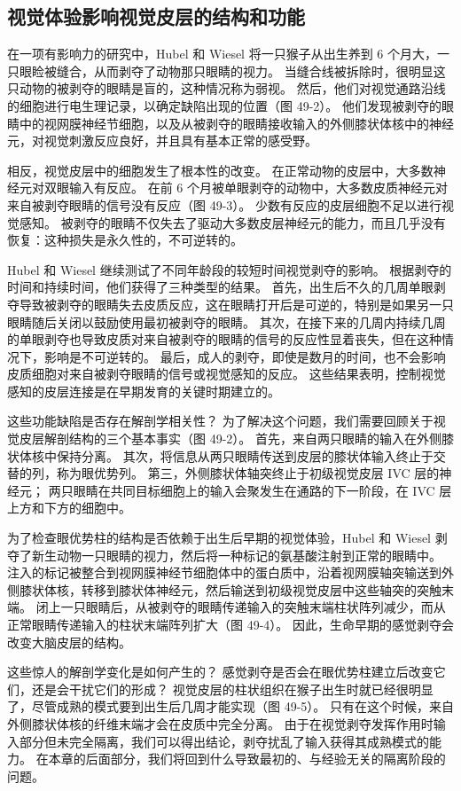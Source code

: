 \subsection{视觉体验影响视觉皮层的结构和功能}
在一项有影响力的研究中，Hubel 和 Wiesel 将一只猴子从出生养到 6 个月大，一只眼睑被缝合，从而剥夺了动物那只眼睛的视力。 当缝合线被拆除时，很明显这只动物的被剥夺的眼睛是盲的，这种情况称为弱视。 然后，他们对视觉通路沿线的细胞进行电生理记录，以确定缺陷出现的位置（图 49-2）。 他们发现被剥夺的眼睛中的视网膜神经节细胞，以及从被剥夺的眼睛接收输入的外侧膝状体核中的神经元，对视觉刺激反应良好，并且具有基本正常的感受野。

相反，视觉皮层中的细胞发生了根本性的改变。 在正常动物的皮层中，大多数神经元对双眼输入有反应。 在前 6 个月被单眼剥夺的动物中，大多数皮质神经元对来自被剥夺眼睛的信号没有反应（图 49-3）。 少数有反应的皮层细胞不足以进行视觉感知。 被剥夺的眼睛不仅失去了驱动大多数皮层神经元的能力，而且几乎没有恢复：这种损失是永久性的，不可逆转的。

Hubel 和 Wiesel 继续测试了不同年龄段的较短时间视觉剥夺的影响。 根据剥夺的时间和持续时间，他们获得了三种类型的结果。 首先，出生后不久的几周单眼剥夺导致被剥夺的眼睛失去皮质反应，这在眼睛打开后是可逆的，特别是如果另一只眼睛随后关闭以鼓励使用最初被剥夺的眼睛。 其次，在接下来的几周内持续几周的单眼剥夺也导致皮质对来自被剥夺的眼睛的信号的反应性显着丧失，但在这种情况下，影响是不可逆转的。 最后，成人的剥夺，即使是数月的时间，也不会影响皮质细胞对来自被剥夺眼睛的信号或视觉感知的反应。 这些结果表明，控制视觉感知的皮层连接是在早期发育的关键时期建立的。

这些功能缺陷是否存在解剖学相关性？ 为了解决这个问题，我们需要回顾关于视觉皮层解剖结构的三个基本事实（图 49-2）。 首先，来自两只眼睛的输入在外侧膝状体核中保持分离。 其次，将信息从两只眼睛传送到皮层的膝状体输入终止于交替的列，称为眼优势列。 第三，外侧膝状体轴突终止于初级视觉皮层 IVC 层的神经元； 两只眼睛在共同目标细胞上的输入会聚发生在通路的下一阶段，在 IVC 层上方和下方的细胞中。

为了检查眼优势柱的结构是否依赖于出生后早期的视觉体验，Hubel 和 Wiesel 剥夺了新生动物一只眼睛的视力，然后将一种标记的氨基酸注射到正常的眼睛中。 注入的标记被整合到视网膜神经节细胞体中的蛋白质中，沿着视网膜轴突输送到外侧膝状体核，转移到膝状体神经元，然后输送到初级视觉皮层中这些轴突的突触末端。 闭上一只眼睛后，从被剥夺的眼睛传递输入的突触末端柱状阵列减少，而从正常眼睛传递输入的柱状末端阵列扩大（图 49-4）。 因此，生命早期的感觉剥夺会改变大脑皮层的结构。

这些惊人的解剖学变化是如何产生的？ 感觉剥夺是否会在眼优势柱建立后改变它们，还是会干扰它们的形成？ 视觉皮层的柱状组织在猴子出生时就已经很明显了，尽管成熟的模式要到出生后几周才能实现（图 49-5）。 只有在这个时候，来自外侧膝状体核的纤维末端才会在皮质中完全分离。 由于在视觉剥夺发挥作用时输入部分但未完全隔离，我们可以得出结论，剥夺扰乱了输入获得其成熟模式的能力。 在本章的后面部分，我们将回到什么导致最初的、与经验无关的隔离阶段的问题。

